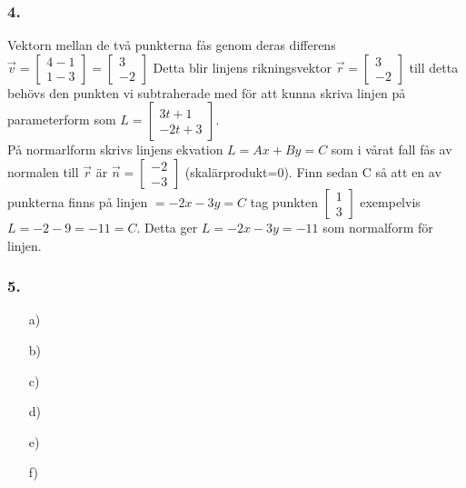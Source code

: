 \documentclass{article}
\begin{document}
\subsubsection*{4.}
Vektorn mellan de två punkterna fås genom deras differens $\vec{v}=\begin{bmatrix} 4-1\\1-3 \end{bmatrix}= \begin{bmatrix} 3\\-2 \end{bmatrix}$ Detta blir linjens rikningsvektor $\vec{r}=\begin{bmatrix} 3\\-2 \end{bmatrix}$ till detta behövs den punkten vi subtraherade med för att kunna skriva linjen på parameterform som $L=\begin{bmatrix} 3t+1 \\-2t+3\end{bmatrix}$.
\\
På normarlform skrivs linjens ekvation $L=Ax+By=C$ som i vårat fall fås av normalen till $\vec{r}$ är $\vec{n}=\begin{bmatrix} -2\\-3 \end{bmatrix}$ (skalärprodukt=0). Finn sedan C så att en av punkterna finns på linjen $=-2x-3y=C$ tag punkten $\begin{bmatrix}1\\3\end{bmatrix}$ exempelvis $L=-2-9=-11=C$. Detta ger $L=-2x-3y=-11$ som normalform för linjen.

\subsubsection*{5.}
\begin{itemize}
\item[a) ]  
\item[b) ] 
\item[c) ] 
\item[d) ] 
\item[e) ] 
\item[f) ] 
\end{itemize}
\end{document}
